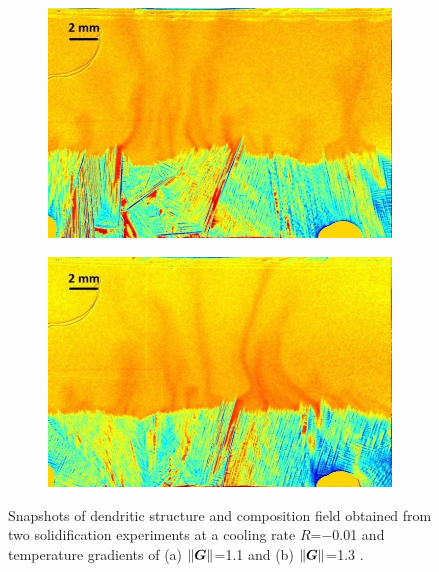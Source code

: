\begin{figure}[htbp]
\centering
  \begin{subfigure}{0.4\textwidth}
    \centering
	\includegraphics[width=\textwidth]{Chapter4/Graphics/freckle_exp/lowgrad.png}
	\caption{}
    \label{fig:exp_lowgrad}
  \end{subfigure}
  \begin{subfigure}{0.4\textwidth}
    \centering
	\includegraphics[width=\textwidth]{Chapter4/Graphics/freckle_exp/highgrad.png}
	\caption{}
    \label{fig:exp_highgrad}
  \end{subfigure}
\captionsetup{singlelinecheck=off}
\caption[.]{Snapshots of dendritic structure and composition field 
obtained from two solidification experiments at a cooling rate 
$R$=\SI{-0.01}{\uCR} and temperature gradients of (a) $\lVert \boldsymbol{G} \rVert$=\SI{1.1}{\ugradT} and (b) $\lVert \boldsymbol{G} \rVert$=\SI{1.3}{\ugradT} \citep{shevchenko_chimney_2013}.} 
\label{fig:experimental_freckles_gradients}
\end{figure}


